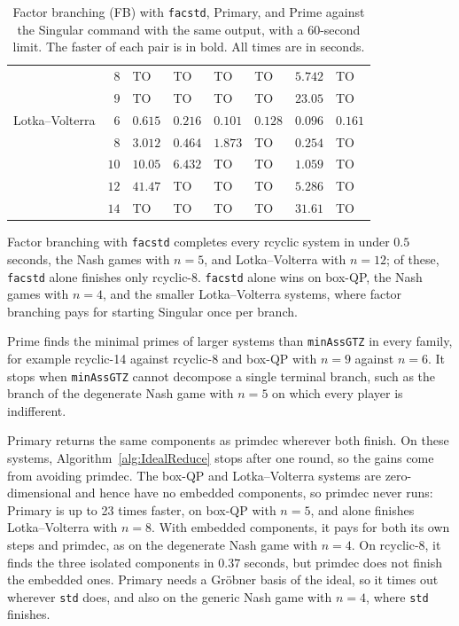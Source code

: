 \begin{table}[pos=htbp]
{\begin{tabular}{l r l l l l l l}
      & $8$ & TO & TO & TO & TO &
      $\mathbf{5.742}$ & TO \\
      & $9$ & TO & TO & TO & TO &
      $\mathbf{23.05}$ & TO \\
      \hline
      Lotka--Volterra & $6$ & $0.615$ & $\mathbf{0.216}$ &
      $\mathbf{0.101}$ & $0.128$ & $\mathbf{0.096}$ & $0.161$ \\
      & $8$ & $3.012$ & $\mathbf{0.464}$ &
      $\mathbf{1.873}$ & TO & $\mathbf{0.254}$ & TO \\
      & $10$ & $10.05$ & $\mathbf{6.432}$ & TO
      & TO & $\mathbf{1.059}$ & TO \\
      & $12$ & $\mathbf{41.47}$ & TO & TO
      & TO & $\mathbf{5.286}$ & TO \\
      & $14$ & TO & TO & TO & TO
      & $\mathbf{31.61}$ & TO \\
      \hline
    \end{tabular}%
  }
  \caption{Factor branching (FB) with \texttt{facstd}, Primary, and Prime
    against the Singular command with the same output, with a 60-second limit.
    The faster of each pair is in bold. All times are in seconds.}
  \label{tab:scaling-decomposition}
\end{table}

Factor branching with \texttt{facstd} completes every rcyclic system in under
$0.5$ seconds, the Nash games with $n=5$, and Lotka--Volterra with $n=12$; of
these, \texttt{facstd} alone finishes only rcyclic-8. \texttt{facstd} alone
wins on box-QP, the Nash games with $n=4$, and the smaller Lotka--Volterra
systems, where factor branching pays for starting Singular once per branch.

Prime finds the minimal primes of larger systems than
\texttt{minAssGTZ} in every family, for example rcyclic-14 against rcyclic-8
and box-QP with $n=9$ against $n=6$. It stops when \texttt{minAssGTZ} cannot
decompose a single terminal branch, such as the branch of the degenerate Nash
game with $n=5$ on which every player is indifferent.

Primary returns the same components as primdec
wherever both finish. On these systems, Algorithm~\ref{alg:IdealReduce} stops
after one round, so the gains come from avoiding primdec. The box-QP and
Lotka--Volterra systems are zero-dimensional and hence have no embedded
components, so primdec never runs: Primary is up to 23 times faster, on box-QP
with $n=5$, and alone finishes Lotka--Volterra with $n=8$. With embedded
components, it pays for both its own steps and primdec, as on the degenerate
Nash game with $n=4$. On rcyclic-8, it finds the three isolated components in
$0.37$ seconds, but primdec does not finish the embedded ones. Primary needs a
Gr\"obner basis of the ideal, so it times out wherever \texttt{std} does, and
also on the generic Nash game with $n=4$, where \texttt{std} finishes.

